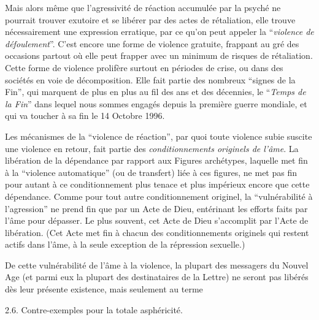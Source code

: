 Mais alors même que l’agressivité de réaction accumulée par la psyché ne pourrait trouver exutoire et se libérer par des actes de rétaliation, elle trouve nécessairement une expression erratique, par ce qu’on peut appeler la ``\textit{violence de défoulement}''. C’est encore une forme de violence gratuite, frappant au gré des occasions partout où elle peut frapper avec un minimum de risques de rétaliation. Cette forme de violence prolifère surtout en périodes de crise, ou dans des sociétés en voie de décomposition. Elle fait partie des nombreux ``signes de la Fin'', qui marquent de plus en plus au fil des ans et des décennies, le ``\textit{Temps de la Fin}'' dans lequel nous sommes engagés depuis la première guerre mondiale, et qui va toucher à sa fin le 14 Octobre 1996.

Les mécanismes de la ``violence de réaction'', par quoi toute violence subie suscite une violence en retour, fait partie des \textit{conditionnements originels de l’âme}. La libération de la dépendance par rapport aux Figures archétypes, laquelle met fin à la ``violence automatique'' (ou de transfert) liée à ces figures, ne met pas fin pour autant à ce conditionnement plus tenace et plus impérieux encore que cette dépendance. Comme pour tout autre conditionnement originel, la ``vulnérabilité à l’agression'' ne prend fin que par un Acte de Dieu, entérinant les efforts faits par l’âme pour  dépasser. Le plus souvent, cet Acte de Dieu s’accomplit par l’Acte de libération. (Cet Acte met fin à chacun des conditionnements originels qui restent actifs dans l’âme, à la seule exception de la répression sexuelle.)

De cette vulnérabilité de l’âme à la violence, la plupart des messagers du Nouvel Age (et parmi eux la plupart des destinataires de la Lettre) ne seront pas libérés dès leur présente existence, mais seulement au terme


2.6. Contre-exemples pour la totale asphéricité.

